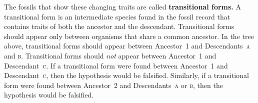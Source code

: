 \documentclass[12pt, hidelinks]{exam}
\begin{document}


The fossils that show these changing traits are called \textbf{transitional forms.} A transitional form is an intermediate species found in the fossil record that contains traits of both the ancestor and the descendant. Transitional forms should appear only between organisms that share a common ancestor.  In the tree above, transitional forms should appear between Ancestor~1 and Descendants~\textsc{a} and \textsc{b}. Transitional forms should \textit{not} appear between Ancestor~1 and Descendant~\textsc{c}.  If a transitional form were found between Ancestor~1 and Descendant~\textsc{c}, then the hypothesis would be falsified. Similarly, if a transitional form were found between Ancestor~2 and Descendants~\textsc{a} or \textsc{b}, then the hypothesis would be falsified.
\end{document}
